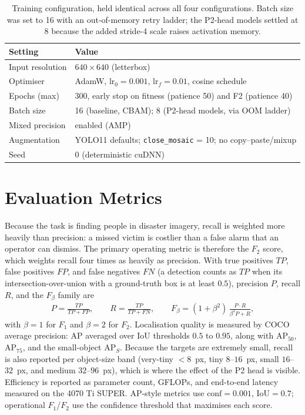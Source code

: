 \begin{table}[tbp]
  \centering
  \caption{Training configuration, held identical across all four configurations.
  Batch size was set to 16 with an out-of-memory retry ladder; the P2-head models
  settled at 8 because the added stride-4 scale raises activation memory.}
  \label{tab:setup}
  \begin{tabular}{@{}l l@{}}
    \toprule
    Setting & Value \\
    \midrule
    Input resolution & $640 \times 640$ (letterbox) \\
    Optimiser & AdamW, $\text{lr}_0 = 0.001$, $\text{lr}_f = 0.01$, cosine schedule \\
    Epochs (max) & 300, early stop on fitness (patience 50) and F2 (patience 40) \\
    Batch size & 16 (baseline, CBAM); 8 (P2-head models, via OOM ladder) \\
    Mixed precision & enabled (AMP) \\
    Augmentation & YOLO11 defaults; \texttt{close\_mosaic} = 10; no copy--paste/mixup \\
    Seed & 0 (deterministic cuDNN) \\
    \bottomrule
  \end{tabular}
\end{table}

\section{Evaluation Metrics}
Because the task is finding people in disaster imagery, recall is weighted more
heavily than precision: a missed victim is costlier than a false alarm that an
operator can dismiss. The primary operating metric is therefore the $F_2$ score,
which weights recall four times as heavily as precision. With true positives
$\mathit{TP}$, false positives $\mathit{FP}$, and false negatives $\mathit{FN}$
(a detection counts as $\mathit{TP}$ when its intersection-over-union with a
ground-truth box is at least $0.5$), precision $P$, recall $R$, and the
$F_\beta$ family are
\begin{align}
  P = \frac{\mathit{TP}}{\mathit{TP}+\mathit{FP}}, \qquad
  R = \frac{\mathit{TP}}{\mathit{TP}+\mathit{FN}}, \qquad
  F_\beta = (1+\beta^{2})\,\frac{P \cdot R}{\beta^{2} P + R},
\end{align}
with $\beta = 1$ for $F_1$ and $\beta = 2$ for $F_2$. Localisation quality is
measured by COCO~\cite{lin2014coco} average precision: $\mathrm{AP}$ averaged over
IoU thresholds $0.5$ to $0.95$, along with $\mathrm{AP}_{50}$, $\mathrm{AP}_{75}$,
and the small-object $\mathrm{AP}_S$. Because the targets are extremely small, recall is
also reported per object-size band (very-tiny $<8$~px, tiny $8$--$16$~px,
small $16$--$32$~px, and medium $32$--$96$~px), which is where the effect of
the P2 head is visible. Efficiency is reported as parameter count, GFLOPs, and
end-to-end latency measured on the 4070 Ti SUPER. AP-style metrics use
$\text{conf} = 0.001$, $\text{IoU} = 0.7$; operational $F_1$/$F_2$ use the
confidence threshold that maximises each score.

